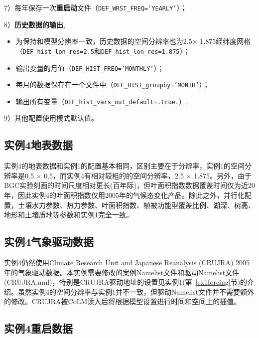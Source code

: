 7）每年保存一次\textbf{重启动}文件（\texttt{DEF\_WRST\_FREQ=‘YEARLY’}）；\par

8）\textbf{历史数据的输出},
\begin{itemize}[nosep,leftmargin=4em]
    \item 为保持和模型分辨率一致，历史数据的空间分辨率也为2.5\textdegree $\times$ 1.875\textdegree 经纬度网格（\texttt{DEF\_hist\_lon\_res=2.5}和\texttt{DEF\_hist\_lon\_res=1.875}）；
    \item 输出变量的月值（\texttt{DEF\_HIST\_FREQ='MONTHLY'}）；
    \item 每月的数据保存在一个文件中（\texttt{DEF\_HIST\_groupby='MONTH'}）；
    \item 输出所有变量（\texttt{DEF\_hist\_vars\_out\_default=.true.}）.
\end{itemize}\par

9）其他配置使用模式默认值。

\subsection{实例4地表数据}

实例4的地表数据和实例1的配置基本相同，区别主要在于分辨率，实例1的空间分辨率是0.5 \textdegree $\times$ 0.5\textdegree，而实例4有相对较粗的的空间分辨率，2.5 \textdegree $\times$ 1.875\textdegree。另外，由于BGC实验刻画的时间尺度相对更长(百年际)，但叶面积指数数据覆盖时间仅为近20年，因此实例4的叶面积指数仅用2005年的气候态变化产品。除此之外，并行化配置，土壤水力参数、热力参数、叶面积指数、植被功能型覆盖比例、湖深、树高、地形和土壤质地等参数和实例1完全一致。

\subsection{实例4气象驱动数据}

实例4仍然使用Climate Research Unit and Japanese Reanalysis (CRUJRA) 2005年的气象驱动数据。本实例需要修改的案例Namelist文件和驱动Namelist文件(CRUJRA.nml)，特别是CRUJRA驱动地址的设置见实例1(第~\ref{ex1forcing}节)的介绍。虽然实例4的空间分辨率与实例1并不一致，但驱动Namelist文件并不需要额外的修改。CRUJRA被CoLM读入后将根据模型设置进行时间和空间上的插值。

\subsection{实例4重启数据}

